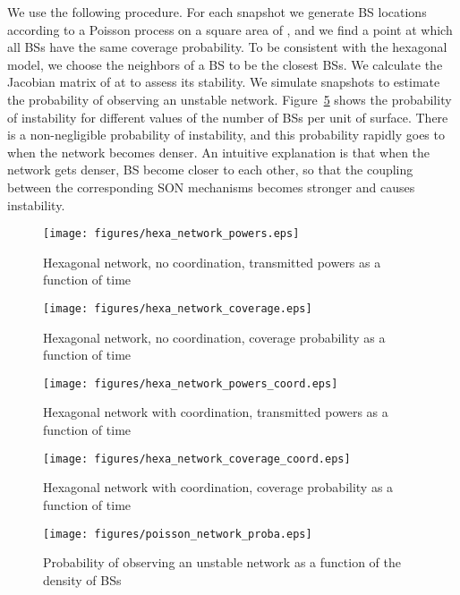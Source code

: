 \documentclass[10pt,conference,letterpaper]{IEEEtran}
\begin{document}
	We use the following procedure. For each snapshot we generate \ac{BS} locations according to a Poisson process on a square area of  , and we find a point  at which all \acp{BS} have the same coverage probability. To be consistent with the hexagonal model, we choose the neighbors of a \ac{BS} to be the  closest \acp{BS}. We calculate the Jacobian matrix of  at  to assess its stability. We simulate  snapshots to estimate the probability of observing an unstable network. Figure~\ref{fig:poisson_network_proba} shows the probability of instability for different values of the number of \acp{BS} per unit of surface. There is a non-negligible probability of instability, and this probability rapidly goes to  when the network becomes denser. An intuitive explanation is that when the network gets denser, \ac{BS} become closer to each other, so that the coupling between the corresponding \ac{SON} mechanisms becomes stronger and causes instability. 
	\begin{figure}[htbp]
		\begin{center}
			\texttt{[image: figures/hexa\_network\_powers.eps]}
		\end{center}
		\caption{Hexagonal network, no coordination, transmitted powers as a function of time}
		\label{fig:hexa_network_powers}
	\end{figure}	
	\begin{figure}[htbp]
		\begin{center}
			\texttt{[image: figures/hexa\_network\_coverage.eps]}
		\end{center}
		\caption{Hexagonal network, no coordination, coverage probability as a function of time}
		\label{fig:hexa_network_coverage}
	\end{figure}
	\begin{figure}[htbp]
		\begin{center}
			\texttt{[image: figures/hexa\_network\_powers\_coord.eps]}
		\end{center}
		\caption{Hexagonal network with coordination, transmitted powers as a function of time}
		\label{fig:hexa_network_powers_coord}
	\end{figure}
	\begin{figure}[htbp]
		\begin{center}
			\texttt{[image: figures/hexa\_network\_coverage\_coord.eps]}
		\end{center}
		\caption{Hexagonal network with coordination, coverage probability as a function of time}
		\label{fig:hexa_network_coverage_coord}
	\end{figure}
	\begin{figure}[htbp]
		\begin{center}
			\texttt{[image: figures/poisson\_network\_proba.eps]}
		\end{center}
		\caption{Probability of observing an unstable network as a function of the density of BSs}
		\label{fig:poisson_network_proba}
	\end{figure}
\end{document}
